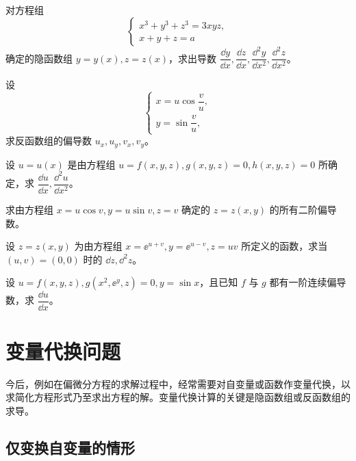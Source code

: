 \begin{xexercise}[3]
对方程组
  \[
    \begin{cases}
      x^3+y^3+z^3=3xyz,\\
      x+y+z=a
    \end{cases}
  \]
  确定的隐函数组 $y=y(x),z=z(x)$，求出导数 $\dfrac{\dd y}{\dd x},\dfrac{\dd z}{\dd x},\dfrac{\dd^2y}{\dd x^2},\dfrac{\dd^2z}{\dd x^2}$。
\end{xexercise}

\begin{xexercise}[4]
设
  \[
    \begin{cases}
      x=u\cos\dfrac vu,\\
      y=\sin\dfrac vu,
    \end{cases}
  \]
  求反函数组的偏导数 $u_x,u_y,v_x,v_y$。
\end{xexercise}

\begin{xexercise}[5]
设 $u=u(x)$ 是由方程组 $u=f(x,y,z),g(x,y,z)=0,h(x,y,z)=0$ 所确定，求 $\dfrac{\dd u}{\dd x},\dfrac{\dd^2u}{\dd x^2}$。
\end{xexercise}

\begin{xexercise}[6]
求由方程组 $x=u\cos v,y=u\sin v,z=v$ 确定的 $z=z(x,y)$ 的所有二阶偏导数。
\end{xexercise}

\begin{xexercise}[7]
设 $z=z(x,y)$ 为由方程组 $x=\ee^{u+v},y=\ee^{u-v},z=uv$ 所定义的函数，求当 $(u,v)=(0,0)$ 时的 $\dd z,\dd^2z$。
\end{xexercise}

\begin{xexercise}[8]
设 $u=f(x,y,z),g(x^2,\ee^y,z)=0,y=\sin x$，且已知 $f$ 与 $g$ 都有一阶连续偏导数，求 $\dfrac{\dd u}{\dd x}$。
\end{xexercise}

\section{变量代换问题}

今后，例如在偏微分方程的求解过程中，经常需要对自变量或函数作变量代换，以求简化方程形式乃至求出方程的解。变量代换计算的关键是隐函数组或反函数组的求导。

\subsection{仅变换自变量的情形}


